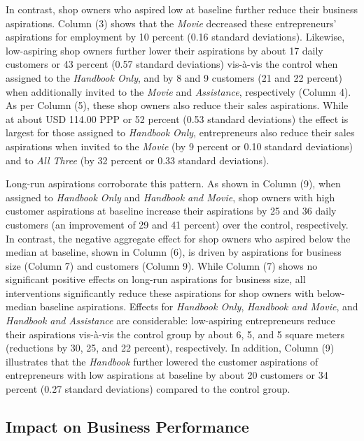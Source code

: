 \documentclass[11.5pt]{article}
\begin{document}
In contrast, shop owners who aspired low at baseline further reduce their business aspirations. Column (3) shows that the \emph{Movie} decreased these entrepreneurs' aspirations for employment by 10 percent (0.16 standard deviations). Likewise, low-aspiring shop owners further lower their aspirations by about 17 daily customers or 43 percent (0.57 standard deviations) vis-\`{a}-vis the control when assigned to the \emph{Handbook Only}, and by 8 and 9 customers (21 and 22 percent) when additionally invited to the \emph{Movie} and \emph{Assistance}, respectively (Column 4). As per Column (5), these shop owners also reduce their sales aspirations. While at about USD 114.00 PPP or 52 percent (0.53 standard deviations) the effect is largest for those assigned to \emph{Handbook Only}, entrepreneurs also reduce their sales aspirations when invited to the \emph{Movie} (by 9 percent or 0.10 standard deviations) and to \emph{All Three} (by 32 percent or 0.33 standard deviations).

Long-run aspirations corroborate this pattern. As shown in Column (9), when assigned to \emph{Handbook Only} and \emph{Handbook and Movie}, shop owners with high customer aspirations at baseline increase their aspirations by 25 and 36 daily customers (an improvement of 29 and 41 percent) over the control, respectively. In contrast, the negative aggregate effect for shop owners who aspired below the median at baseline, shown in Column (6), is driven by aspirations for business size (Column 7) and customers (Column 9). While Column (7) shows no significant positive effects on long-run aspirations for business size, all interventions significantly reduce these aspirations for shop owners with below-median baseline aspirations. Effects for \emph{Handbook Only}, \emph{Handbook and Movie}, and \emph{Handbook and Assistance} are considerable: low-aspiring entrepreneurs reduce their aspirations vis-\`{a}-vis the control group by about 6, 5, and 5 square meters (reductions by 30, 25, and 22 percent), respectively. In addition, Column (9) illustrates that the \emph{Handbook} further lowered the customer aspirations of entrepreneurs with low aspirations at baseline by about 20 customers or 34 percent (0.27 standard deviations) compared to the control group.


\subsection{Impact on Business Performance}
\end{document}
